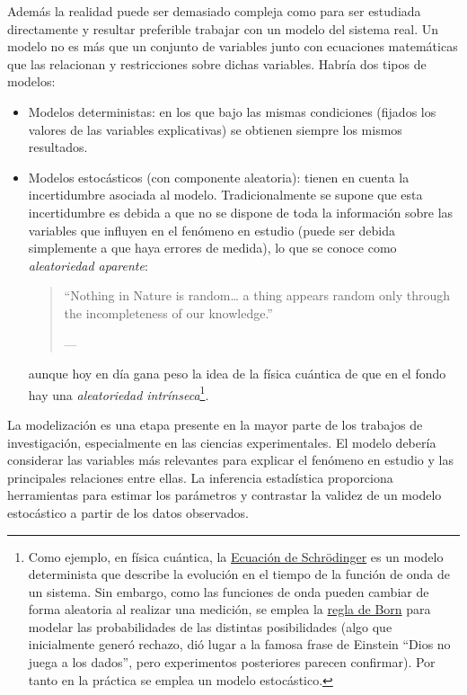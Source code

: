 \documentclass[
  10pt,
]{book}
\theoremstyle{break}
\theoremstyle{nonumberplain}
\let\oldfootnote\footnote
\renewcommand\footnote[1]{\oldfootnote{\hspace{2mm}#1}}
\begin{document}
Además la realidad puede ser demasiado compleja como para ser estudiada directamente y resultar preferible trabajar con un modelo del sistema real.
Un modelo no es más que un conjunto de variables junto con ecuaciones matemáticas que las relacionan y restricciones sobre dichas variables.
Habría dos tipos de modelos:

\begin{itemize}
\item
  Modelos deterministas: en los que bajo las mismas condiciones (fijados los valores de las variables explicativas) se obtienen siempre los mismos resultados.
\item
  Modelos estocásticos (con componente aleatoria): tienen en cuenta la incertidumbre asociada al modelo. Tradicionalmente se supone que esta incertidumbre es debida a que no se dispone de toda la información sobre las variables que influyen en el fenómeno en estudio (puede ser debida simplemente a que haya errores de medida), lo que se conoce como \emph{aleatoriedad aparente}:

  \begin{quote}
  ``Nothing in Nature is random\ldots{} a thing appears random only through the incompleteness of our knowledge.''

  --- \citet{spinoza1667ethics}
  \end{quote}

  aunque hoy en día gana peso la idea de la física cuántica de que en el fondo hay una \emph{aleatoriedad intrínseca}\footnote{Como ejemplo, en física cuántica, la \href{https://es.wikipedia.org/wiki/Ecuaci\%C3\%B3n_de_Schr\%C3\%B6dinger}{Ecuación de Schrödinger} es un modelo determinista que describe la evolución en el tiempo de la función de onda de un sistema. Sin embargo, como las funciones de onda pueden cambiar de forma aleatoria al realizar una medición, se emplea la \href{https://es.wikipedia.org/wiki/Regla_de_Born}{regla de Born} para modelar las probabilidades de las distintas posibilidades (algo que inicialmente generó rechazo, dió lugar a la famosa frase de Einstein ``Dios no juega a los dados'', pero experimentos posteriores parecen confirmar). Por tanto en la práctica se emplea un modelo estocástico.}.
\end{itemize}

La modelización es una etapa presente en la mayor parte de los trabajos de investigación, especialmente en las ciencias experimentales.
El modelo debería considerar las variables más relevantes para explicar el fenómeno en estudio y las principales relaciones entre ellas.
La inferencia estadística proporciona herramientas para estimar los parámetros y contrastar la validez de un modelo estocástico a partir de los datos observados.
\end{document}
